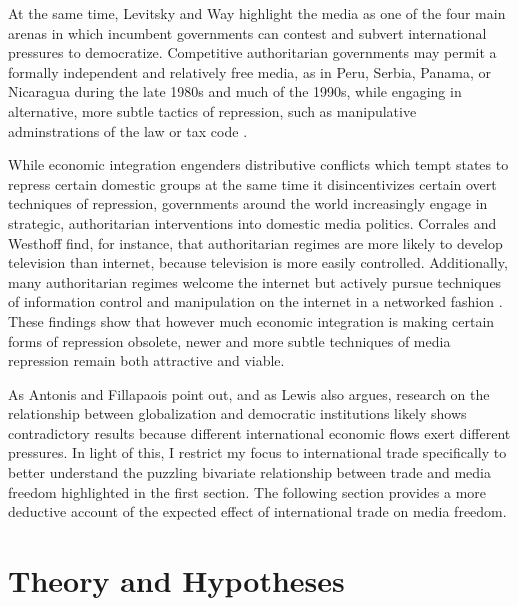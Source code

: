 \documentclass[12pt,a4paper]{article}\usepackage[]{graphicx}\usepackage[]{color}
\begin{document}
At the same time, Levitsky and Way highlight the media as one of the four main arenas in which incumbent governments can contest and subvert international pressures to democratize. Competitive authoritarian governments may permit a formally independent and relatively free media, as in Peru, Serbia, Panama, or Nicaragua during the late 1980s and much of the 1990s, while engaging in alternative, more subtle tactics of repression, such as manipulative adminstrations of the law or tax code \parencite[53, 58]{Levitsky:2002gx}.

While economic integration engenders distributive conflicts which tempt states to repress certain domestic groups at the same time it disincentivizes certain overt techniques of repression, governments around the world increasingly engage in strategic, authoritarian interventions into domestic media politics. Corrales and Westhoff \parencite*{Corrales:2006vz} find, for instance, that authoritarian regimes are more likely to develop television than internet, because television is more easily controlled. Additionally, many authoritarian regimes welcome the internet but actively pursue techniques of information control and manipulation on the internet in a networked fashion \parencites{MacKinnon:2011id}{Pearce:2012fm}. These findings show that however much economic integration is making certain forms of repression obsolete, newer and more subtle techniques of media repression remain both attractive and viable.

As Antonis and Fillapaois point out, and as Lewis also argues, research on the relationship between globalization and democratic institutions likely shows contradictory results because different international economic flows exert different pressures. In light of this, I restrict my focus to international trade specifically to better understand the puzzling bivariate relationship between trade and media freedom highlighted in the first section. The following section provides a more deductive account of the expected effect of international trade on media freedom.

\section{Theory and Hypotheses}
\end{document}
